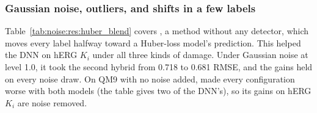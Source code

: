 \subsubsection{Gaussian noise, outliers, and shifts in a few labels}\label{sec:noise:res:other_kinds}

Table~\ref{tab:noise:res:huber_blend} covers , a method without any detector, which moves every label halfway toward a Huber-loss model's prediction. This helped the DNN on hERG $K_i$ under all three kinds of damage. Under Gaussian noise at level 1.0, it took the second hybrid from 0.718 to 0.681 RMSE, and the gains held on every noise draw. On QM9 with no noise added,  made every configuration worse with both models (the table gives two of the DNN's), so its gains on hERG $K_i$ are noise removed.

